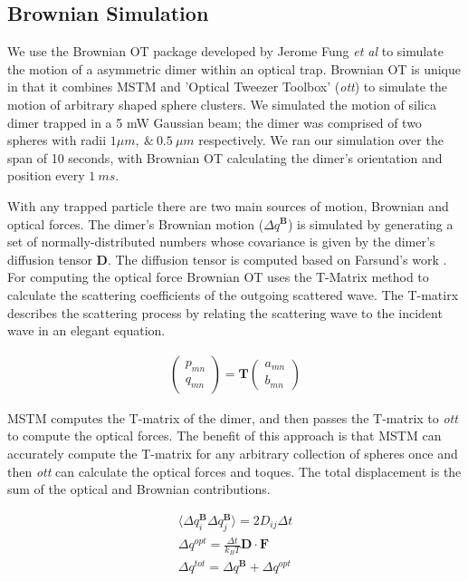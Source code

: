 \documentclass[final, 3p]{elsarticle}
\begin{document}
\subsection{Brownian Simulation}
\label{sec:2.1}
We use the Brownian OT package developed by Jerome Fung \textit{et al} \cite{Vigilante2020Brownian_OT} to simulate the motion of a asymmetric dimer within an optical trap. Brownian OT is unique in that it combines MSTM \cite{Mishchenko1996MSTM} and 'Optical Tweezer Toolbox' (\textit{ott}) \cite{Lenton2020} to simulate the motion of arbitrary shaped sphere clusters. We simulated the motion of silica dimer trapped in a 5 mW Gaussian beam; the dimer was comprised of two spheres with radii $1\mu m, \ \& \ 0.5 \ \mu m$ respectively. We ran our simulation over the span of 10 seconds, with Brownian OT calculating the dimer's orientation and position every $1 \ ms$. 

With any trapped particle there are two main sources of motion, Brownian and optical forces. The dimer's Brownian motion ($\Delta q^{\textbf{B}}$) is simulated by generating a set of normally-distributed numbers whose covariance is given by the dimer's diffusion tensor $\textbf{D}$. The diffusion tensor is computed based on Farsund's work \cite{Farsund1996}. For computing the optical force Brownian OT uses the T-Matrix method to calculate the scattering coefficients of the outgoing scattered wave. The T-matirx describes the scattering process by relating the scattering wave to the incident wave in an elegant equation.

\begin{align}
	\begin{pmatrix}
		p_{mn} \\
		q_{mn}
	\end{pmatrix}
	= \textbf{T}
	\begin{pmatrix}
		a_{mn} \\
		b_{mn}
	\end{pmatrix}
\end{align}

MSTM computes the T-matrix of the dimer, and then passes the T-matrix to \textit{ott} to compute the optical forces. The benefit of this approach is that MSTM can accurately compute the T-matrix for any arbitrary collection of spheres once and then \textit{ott} can calculate the optical forces and toques. The total displacement is the sum of the optical and Brownian contributions.

\begin{align}
	\langle \Delta q_i^{\textbf{B}} \Delta q_j^{\textbf{B}}\rangle = 2D_{ij} \Delta t \\
	\Delta q^{opt} = \frac{\Delta t}{k_BT}\textbf{D} \cdot \textbf{F} \\
	\Delta q^{tot} = \Delta q^{\textbf{B}} + \Delta q^{opt}
\end{align}
\end{document}
